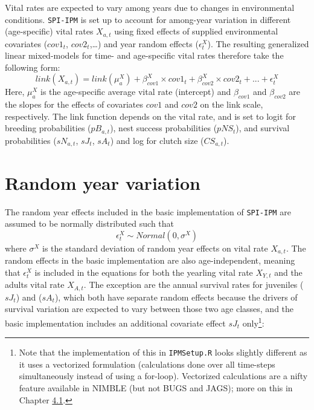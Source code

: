 \documentclass[
]{book}
\begin{document}
Vital rates are expected to vary among years due to changes in environmental
conditions. \texttt{SPI-IPM} is set up to account for among-year variation in
different (age-specific) vital rates \(X_{a,t}\) using fixed effects of
supplied environmental covariates (\(cov1_t\), \(cov2_t\),\ldots) and year random effects (\(\epsilon_t^X\)). The resulting generalized linear
mixed-models for time- and age-specific vital rates therefore take the following
form:
\begin{equation}
  link(X_{a,t}) = link(\mu_a^X) + \beta_{cov1}^X\times cov1_t + \beta_{cov2}^X\times cov2_t + ... + \epsilon_t^X
\end{equation}
Here, \(\mu_a^X\) is the age-specific average vital rate (intercept) and \(\beta_{cov1}\)
and \(\beta_{cov2}\) are the slopes for the effects of covariates \(cov1\) and \(cov2\)
on the link scale, respectively.
The link function depends on the vital rate, and is set to logit for breeding
probabilities (\(pB_{a,t}\)), nest success probabilities (\(pNS_t\)), and survival
probabilities (\(sN_{a,t}\), \(sJ_t\), \(sA_t\)) and log for clutch size (\(CS_{a,t}\)).

\hypertarget{random-year-variation}{%
\section{Random year variation}\label{random-year-variation}}

The random year effects included in the basic implementation of \texttt{SPI-IPM} are
assumed to be normally distributed such that
\begin{equation}
  \epsilon_{t}^X \sim Normal(0, \sigma^X)
\end{equation}
where \(\sigma^X\) is the standard deviation of random year effects on vital rate
\(X_{a,t}\).
The random effects in the basic implementation are also age-independent, meaning
that \(\epsilon_t^X\) is included in the equations for both the yearling vital
rate \(X_{Y,t}\) and the adults vital rate \(X_{A,t}\). The exception are the annual
survival rates for juveniles (\(sJ_t\)) and (\(sA_t\)), which both have separate
random effects because the drivers of survival variation are expected to vary
between those two age classes, and the basic implementation includes an
additional covariate effect \(sJ_t\) only\footnote{Note that the implementation of this
  in \texttt{IPMSetup.R} looks slightly different as it uses a vectorized formulation
  (calculations done over all time-steps simultaneously instead of using a
  for-loop). Vectorized calculations are a nifty feature available in NIMBLE (but
  not BUGS and JAGS); more on this in Chapter \protect\hyperlink{ux5cux23ux5cux2520Efficientux5cux2520implementationux5cux2520usingux5cux2520NIMBLE}{4.1}.}:
\end{document}

